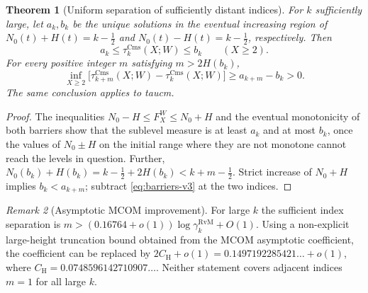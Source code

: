 \documentclass[11pt,a4paper]{article}
\numberwithin{equation}{section}
\newtheorem{theorem}{Theorem}[section]
\theoremstyle{definition}
\theoremstyle{remark}
\newtheorem{remark}[theorem]{Remark}
\newcommand{\Cms}{\mathrm{Cms}}
\begin{document}
\begin{theorem}[Uniform separation of sufficiently distant indices]
\label{thm:block-sep-v3}
For $k$ sufficiently large, let $a_k,b_k$ be the unique solutions in
the eventual increasing region of $N_0(t)+H(t)=k-\tfrac12$ and
$N_0(t)-H(t)=k-\tfrac12$, respectively. Then
\begin{equation}\label{eq:barriers-v3}
a_k\le\tau_k^{\Cms}(X;W)\le b_k\qquad(X\ge2).
\end{equation}
For every positive integer $m$ satisfying
$m>2H(b_k)$,
\begin{equation}\label{eq:blocksep-v3}
\inf_{X\ge2}\bigl[\tau_{k+m}^{\Cms}(X;W)-
\tau_k^{\Cms}(X;W)\bigr]\ge a_{k+m}-b_k>0.
\end{equation}
The same conclusion applies to taucm.
\end{theorem}
\begin{proof}
The inequalities $N_0-H\le F_X^W\le N_0+H$ and the eventual
monotonicity of both barriers show that the sublevel measure is at least
$a_k$ and at most $b_k$, once the values of $N_0\pm H$ on the initial range where they are not monotone cannot
reach the levels in question. Further,
$N_0(b_k)+H(b_k)=k-\tfrac12+2H(b_k)<k+m-\tfrac12$.
Strict increase of $N_0+H$ implies $b_k<a_{k+m}$; subtract
\eqref{eq:barriers-v3} at the two indices.\end{proof}
\begin{remark}[Asymptotic MCOM improvement]
For large $k$ the sufficient index separation is
$m>(0.16764+o(1))\log\gamma_k^{\mathrm{RvM}}+O(1)$.
Using a non-explicit large-height truncation bound obtained from the
MCOM asymptotic coefficient, the coefficient can be replaced by
$2C_{\mathrm H}+o(1)=0.1497192285421\ldots+o(1)$, where
$C_{\mathrm H}=0.0748596142710907\ldots$.
Neither statement covers adjacent indices $m=1$ for all large $k$.
\end{remark}
\end{document}
